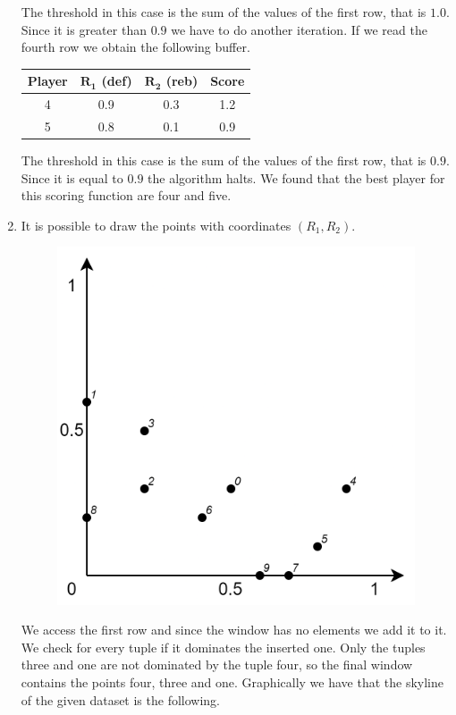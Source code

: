 \begin{enumerate}
\begin{table}[H]
\begin{tabular}{c|cc|c}
            \end{tabular}
        \end{table}
        The threshold in this case is the sum of the values of the first row, that is $1.0$. 
        Since it is greater than $0.9$ we have to do another iteration. 
        If we read the fourth row we obtain the following buffer. 
        \begin{table}[H]
            \centering
            \begin{tabular}{c|cc|c}
            \hline
            \textbf{Player} & \textbf{$\boldsymbol{R_1}$ (def)} & \textbf{$\boldsymbol{R_2}$ (reb)} & \textbf{Score} \\ \hline
            4               & 0.9                               & 0.3                               & 1.2            \\
            5               & 0.8                               & 0.1                               & 0.9            \\ \hline
            \end{tabular}
        \end{table}
        The threshold in this case is the sum of the values of the first row, that is $0.9$.
        Since it is equal to $0.9$ the algorithm halts. 
        We found that the best player for this scoring function are four and five. 
    \item It is possible to draw the points with coordinates $(R_1,R_2)$. 
        \begin{figure}[H]
            \centering
            \includegraphics[width=0.35\linewidth]{images/skyline.png}
        \end{figure}
        We access the first row and since the window has no elements we add it to it. 
        We check for every tuple if it dominates the inserted one. 
        Only the tuples three and one are not dominated by the tuple four, so the final window contains the points four, three and one. 
        Graphically we have that the skyline of the given dataset is the following. 
        \begin{figure}[H]

\end{figure}
\end{enumerate}
